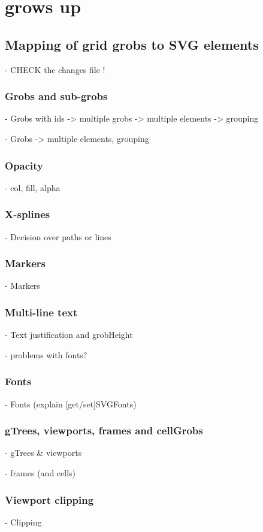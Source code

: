 \chapter{\gridSVG{} grows up}

\section{Mapping of grid grobs to SVG elements}

    - CHECK the changes file !

\subsection{Grobs and sub-grobs}

    - Grobs with ids -> multiple grobs -> multiple elements -> grouping

    - Grobs -> multiple elements, grouping

\subsection{Opacity}

    - col, fill, alpha

\subsection{X-splines}

    - Decision over paths or lines

\subsection{Markers}
    - Markers

\subsection{Multi-line text}

    - Text justification and grobHeight

    - problems with fonts?

\subsection{Fonts}

    - Fonts (explain [get/set]SVGFonts)

\subsection{gTrees, viewports, frames and cellGrobs}

    - gTrees \& viewports

    - frames (and cells)

\subsection{Viewport clipping}

    - Clipping
